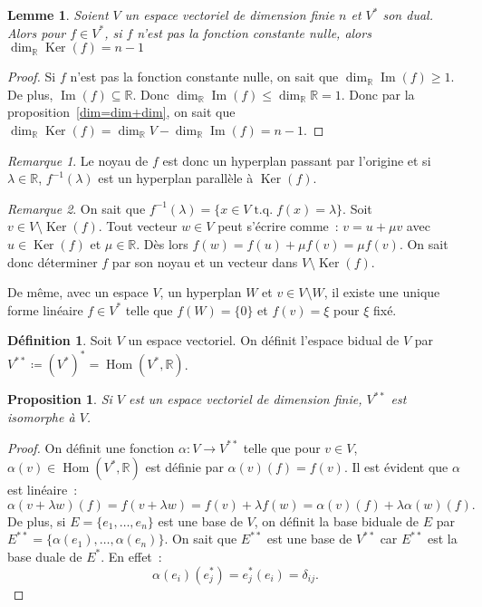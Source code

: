 \documentclass{article}
\DeclareMathOperator{\tq}{\text{ t.q. }}
\DeclareMathOperator{\Ker}{Ker}
\DeclareMathOperator{\Imf}{Im}
\DeclareMathOperator{\Hom}{Hom}
\newcommand{\R}{\mathbb R}
\newtheorem{prp}[thm]{Proposition}
\newtheorem{lem}[thm]{Lemme}
\theoremstyle{definition}
\newtheorem{déf}[thm]{Définition}
\theoremstyle{remark}
\newtheorem*{rmq}{Remarque}
\begin{document}
		\begin{lem} Soient $V$ un espace vectoriel de dimension finie $n$ et $V^*$ son dual. Alors pour $f \in V^*$, si $f$ n'est pas la fonction constante nulle,
		alors $\dim_\R \Ker(f) = n-1$ \end{lem}

		\begin{proof} Si $f$ n'est pas la fonction constante nulle, on sait que $\dim_\R \Imf(f) \geq 1$. De plus, $\Imf(f) \subseteq \R$. Donc
		$\dim_\R\Imf(f) \leq \dim_\R \R = 1$. Donc par la proposition~\ref{dim=dim+dim}, on sait que $\dim_\R\Ker(f) = \dim_\R V - \dim_\R\Imf(f) = n-1$. \end{proof}

		\begin{rmq} Le noyau de $f$ est donc un hyperplan passant par l'origine et si $\lambda \in \R$, $f^{-1}(\lambda)$ est un hyperplan parallèle à $\Ker(f)$. \end{rmq}

		\begin{rmq} On sait que $f^{-1}(\lambda) = \{x \in V \tq f(x) = \lambda\}$. Soit $v \in V \setminus \Ker(f)$. Tout vecteur $w \in V$ peut s'écrire comme~:
		$v = u + \mu v$ avec $u \in \Ker(f)$ et $\mu \in \R$. Dès lors $f(w) = f(u) + \mu f(v) = \mu f(v)$. On sait donc déterminer $f$ par son noyau et un vecteur dans
		$V \setminus \Ker(f)$. 

		De même, avec un espace $V$, un hyperplan $W$ et $v \in V \setminus W$, il existe une unique forme linéaire $f \in V^*$ telle que $f(W) = \{0\}$ et $f(v) = \xi$
		pour $\xi$ fixé. \end{rmq}

		\begin{déf} Soit $V$ un espace vectoriel. On définit l'espace bidual de $V$ par $V^{**} \coloneqq (V^*)^* = \Hom(V^*, \R)$. \end{déf}

		\begin{prp} Si $V$ est un espace vectoriel de dimension finie, $V^{**}$ est isomorphe à $V$. \end{prp}

		\begin{proof} On définit une fonction $\alpha : V \to V^{**}$ telle que pour $v \in V$, $\alpha(v) \in \Hom(V^*, \R)$ est définie par $\alpha(v)(f) = f(v)$.
		Il est évident que $\alpha$ est linéaire~: \[\alpha(v+\lambda w)(f) = f(v+\lambda w) = f(v)+\lambda f(w) = \alpha(v)(f) + \lambda\alpha(w)(f).\]
		De plus, si $E = \{e_1, \dotsc, e_n\}$ est une base de $V$, on définit la base biduale de $E$ par $E^{**} = \{\alpha(e_1), \dotsc, \alpha(e_n)\}$.
		On sait que $E^{**}$ est une base de $V^{**}$ car $E^{**}$ est la base duale de $E^*$. En effet~: \[\alpha(e_i)(e_j^*) = e_j^*(e_i) = \delta_{ij}.\] \end{proof}
\end{document}
